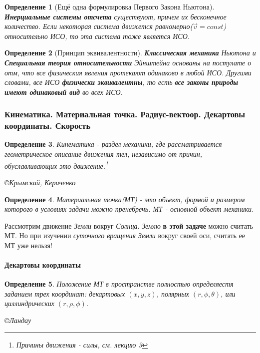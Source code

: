 \documentclass{article}
\newtheorem{theorem}{Определение} %
\begin{document}
\begin{theorem}[Ещё одна формулировка Первого Закона Ньютона]
\textbf{Инерциальные системы отсчета} существуют, причем их бесконечное количество. Если некоторая система движется равномерно($\vec{v}=const$) относительно ИСО, то эта система тоже является ИСО.
\end{theorem}

\begin{theorem}[Принцип эквивалентности]
\textbf{Классическая механика} Ньютона и \textbf{Специальная теория относительности} Эйнштейна основаны на постулате о отм, что все физическия явления протекают одинаково в любой ИСО. Другими словами, все ИСО \textbf{физически эквивалентны}, то есть \textbf{все законы природы имеют одинаковый вид} во всех ИСО. 
\end{theorem}

\subsubsection{Кинематика. Материальная точка. Радиус-вектоор. Декартовы координаты. Скорость}
 
\begin{theorem}
Кинематика - раздел механики, где рассматривается геометрическое описание движения тел, независимо от причин, обуславливающих это движение.\footnote{Причины движения - силы, см. лекцию 3}

 \copyright{Крымский, Кериченко}
\end{theorem}


\begin{theorem}
Материальная точка(МТ) - это объект, формой и размером которого в условиях задачи можно пренебречь. МТ - основной объект механики.
\end{theorem}

Рассмотрим движение \emph{Земли} вокруг \emph{Солнца}. \emph{Землю} \textbf{ в этой задаче} можно считать МТ. Но при изучении \emph{суточного вращения Земли} вокруг своей оси, считать ее МТ уже нельзя!

\paragraph{Декартовы координаты}
\begin{theorem}
Положение МТ в пространстве полностью определяестя заданием трех координат: декартовых $(x,y,z)$, полярных $(r, \phi, \theta)$, или циллиндрических $(r,\rho, \phi)$.

\copyright{Ландау}
\end{theorem}
\end{document}
